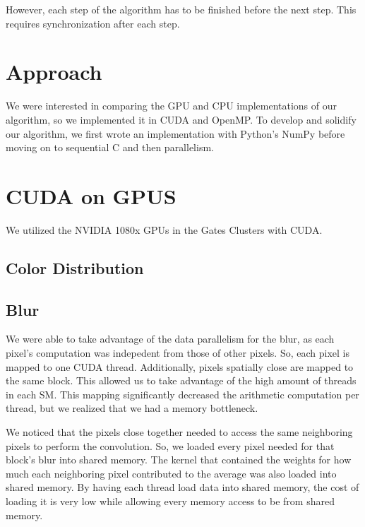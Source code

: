 \documentclass[12pt]{article}
\begin{document}
However, each step of the algorithm has to be finished before the next step.
This requires synchronization after each step.

\section{Approach}
We were interested in comparing the GPU and CPU implementations of
our algorithm, so we implemented it in CUDA and OpenMP.
To develop and solidify our algorithm, we first wrote an implementation with
Python's NumPy before moving on to sequential C and then parallelism.

\section{CUDA on GPUS}
We utilized the NVIDIA 1080x GPUs in the Gates Clusters with CUDA.

\subsection{Color Distribution}


\subsection{Blur}
We were able to take advantage of the data parallelism for the blur, as each
pixel's computation was indepedent from those of other pixels. So, each pixel
is mapped to one CUDA thread. Additionally, pixels spatially close are mapped to
the same block. This allowed us to take advantage of the high
amount of threads in each SM. This mapping significantly decreased the
arithmetic computation per thread, but we realized that we had a memory
bottleneck.

We noticed that the pixels close together needed to access the same neighboring
pixels to perform the convolution. So, we loaded every pixel needed for that
block's blur into shared memory. The kernel that contained the weights for how
much each neighboring pixel contributed to the average was also loaded into
shared memory. By having each thread load data into shared
memory, the cost of loading it is very low while allowing every memory
access to be from shared memory.
\end{document}
